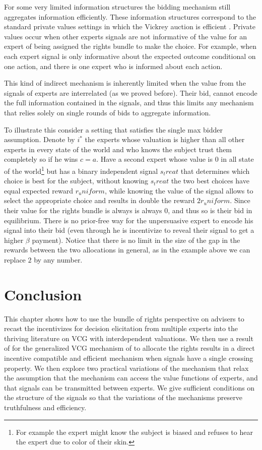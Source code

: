  For some very limited information structures the bidding mechanism still aggregates information efficiently. 
 These information structures correspond to the standard private values settings in which the Vickrey auction is efficient \cite{vickrey1961}.
 Private values occur when other experts signals are not informative of the value for an expert of being assigned the rights bundle to make the choice.
 For example, when each expert signal is only informative about the expected outcome conditional on one action, and  there is one expert who is informed about each action.
 
 
 This kind of indirect mechanism is inherently limited when the value from the signals of experts are interrelated (as we proved before). Their bid, cannot encode the full information contained in the signals, and thus this limits any mechanism that relies solely on single rounds of bids to aggregate information.
 
 To illustrate this consider a setting that satisfies the single max bidder assumption. Denote by $i^*$ the experts whose valuation is higher than all other experts in every state of the world and who knows the subject trust them completely so if he wins $c=a$. Have a second expert whose value is $0$ in all state of the world\footnote{For example the expert might know the subject is biased and refuses to hear the expert due to color of their skin.} but has a binary independent signal $s_treat$ that determines which choice is best for the subject, without knowing $s_treat$ the two best choices have equal expected reward $r_uniform$, while knowing the value of the signal allows to select the appropriate choice and results in double the reward $2r_uniform$.
 Since their value for the rights bundle is always is always 0, and thus so is their bid in equilibrium. 
 There is no prior-free way for the unpersuasive expert to encode his signal into their bid (even through he is incentivize to reveal their signal to get a higher $\beta$ payment). 
 Notice that there is no limit in the size of the gap in the rewards between the two allocations in general, as in the example above we can replace $2$ by any number.
 
 

\section{Conclusion}

This chapter shows how to use the bundle of rights perspective on advisers to recast the incentivizes for decision elicitation from multiple experts into the thriving literature on VCG with interdependent valuations.
We then use a result of \cite{roughgarden2016optimal} for the generalized VCG mechanism of \cite{maskin1992auctions} to allocate the rights results in a direct incentive compatible and efficient mechanism when signals have a single crossing property.
We then explore two practical variations of the mechanism that relax the assumption that the mechanism can access the value functions of experts, and that signals can be transmitted between experts. We give sufficient conditions on the structure of the signals so that the variations of the mechanisms preserve truthfulness and efficiency.